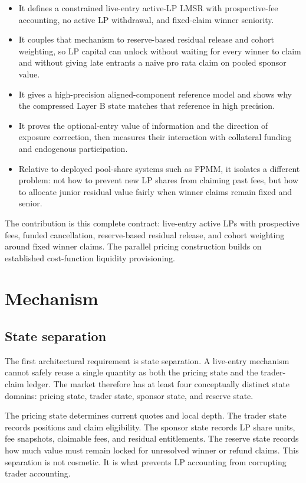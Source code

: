 \documentclass[10pt]{article}
\begin{document}
\begin{itemize}
\item It defines a constrained live-entry active-LP LMSR with prospective-fee accounting, no active LP withdrawal, and fixed-claim winner seniority.
\item It couples that mechanism to reserve-based residual release and cohort weighting, so LP capital can unlock without waiting for every winner to claim and without giving late entrants a naive pro rata claim on pooled sponsor value.
\item It gives a high-precision aligned-component reference model and shows why the compressed Layer B state matches that reference in high precision.
\item It proves the optional-entry value of information and the direction of exposure correction, then measures their interaction with collateral funding and endogenous participation.
\item Relative to deployed pool-share systems such as FPMM, it isolates a different problem: not how to prevent new LP shares from claiming past fees, but how to allocate junior residual value fairly when winner claims remain fixed and senior.
\end{itemize}

The contribution is this complete contract: live-entry active LPs with prospective fees, funded cancellation, reserve-based residual release, and cohort weighting around fixed winner claims. The parallel pricing construction builds on established cost-function liquidity provisioning.

\section{Mechanism}

\subsection{State separation}

The first architectural requirement is state separation. A live-entry mechanism cannot safely reuse a single quantity as both the pricing state and the trader-claim ledger. The market therefore has at least four conceptually distinct state domains: pricing state, trader state, sponsor state, and reserve state.

The pricing state determines current quotes and local depth. The trader state records positions and claim eligibility. The sponsor state records LP share units, fee snapshots, claimable fees, and residual entitlements. The reserve state records how much value must remain locked for unresolved winner or refund claims. This separation is not cosmetic. It is what prevents LP accounting from corrupting trader accounting.
\end{document}
